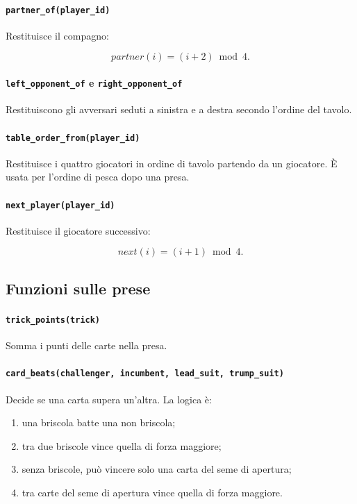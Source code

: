 \documentclass[11pt,a4paper]{article}
\begin{document}
\paragraph{\texttt{partner\_of(player\_id)}}

Restituisce il compagno:

\[
partner(i) = (i+2) \bmod 4.
\]

\paragraph{\texttt{left\_opponent\_of} e \texttt{right\_opponent\_of}}

Restituiscono gli avversari seduti a sinistra e a destra secondo l'ordine del
tavolo.

\paragraph{\texttt{table\_order\_from(player\_id)}}

Restituisce i quattro giocatori in ordine di tavolo partendo da un giocatore.
È usata per l'ordine di pesca dopo una presa.

\paragraph{\texttt{next\_player(player\_id)}}

Restituisce il giocatore successivo:

\[
next(i)=(i+1)\bmod 4.
\]

\subsection{Funzioni sulle prese}

\paragraph{\texttt{trick\_points(trick)}}

Somma i punti delle carte nella presa.

\paragraph{\texttt{card\_beats(challenger, incumbent, lead\_suit, trump\_suit)}}

Decide se una carta supera un'altra. La logica è:

\begin{enumerate}
  \item una briscola batte una non briscola;
  \item tra due briscole vince quella di forza maggiore;
  \item senza briscole, può vincere solo una carta del seme di apertura;
  \item tra carte del seme di apertura vince quella di forza maggiore.
\end{enumerate}
\end{document}
